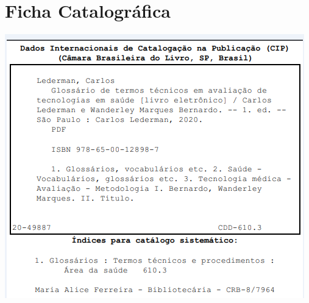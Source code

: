 \documentclass[
  openany]{book}
\begin{document}
\hypertarget{ficha-catalogruxe1fica}{%
\chapter*{Ficha Catalográfica}\label{ficha-catalogruxe1fica}}

\begin{center}\includegraphics[width=height=4in,width=3in]{ficha_catalog_pdf} \end{center}

  
\end{document}

